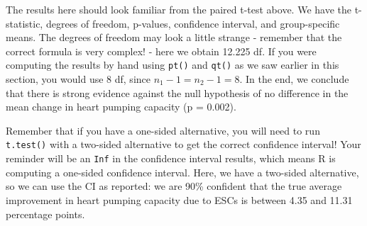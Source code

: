 \documentclass[
  10pt,
  openany]{book}
\newenvironment{Shaded}{\begin{snugshade}}{\end{snugshade}}
\newcommand{\AttributeTok}[1]{\textcolor[rgb]{0.13,0.29,0.53}{#1}}
\newcommand{\CommentTok}[1]{\textcolor[rgb]{0.56,0.35,0.01}{\textit{#1}}}
\newcommand{\FloatTok}[1]{\textcolor[rgb]{0.00,0.00,0.81}{#1}}
\newcommand{\FunctionTok}[1]{\textcolor[rgb]{0.13,0.29,0.53}{\textbf{#1}}}
\newcommand{\NormalTok}[1]{#1}
\newcommand{\SpecialCharTok}[1]{\textcolor[rgb]{0.81,0.36,0.00}{\textbf{#1}}}
\newcommand{\StringTok}[1]{\textcolor[rgb]{0.31,0.60,0.02}{#1}}
\theoremstyle{definition}
\theoremstyle{definition}
\theoremstyle{definition}
\theoremstyle{definition}
\theoremstyle{remark}
\begin{document}
\begin{Shaded}
\end{Shaded}

The results here should look familiar from the paired t-test above. We have the t-statistic, degrees of freedom, p-values, confidence interval, and group-specific means. The degrees of freedom may look a little strange - remember that the correct formula is very complex! - here we obtain 12.225 df. If you were computing the results by hand using \texttt{pt()} and \texttt{qt()} as we saw earlier in this section, you would use 8 df, since \(n_1 -1 = n_2 -1 = 8\). In the end, we conclude that there is strong evidence against the null hypothesis of no difference in the mean change in heart pumping capacity (p = 0.002).

Remember that if you have a one-sided alternative, you will need to run \texttt{t.test()} with a two-sided alternative to get the correct confidence interval! Your reminder will be an \texttt{Inf} in the confidence interval results, which means R is computing a one-sided confidence interval. Here, we have a two-sided alternative, so we can use the CI as reported: we are 90\% confident that the true average improvement in heart pumping capacity due to ESCs is between 4.35 and 11.31 percentage points.
\end{document}
